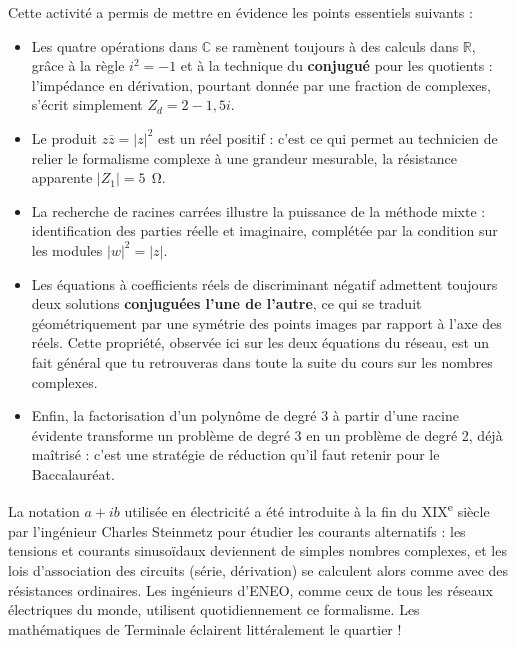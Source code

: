 \documentclass[11pt]{article}
\newcounter{popsec}
\newcounter{popsub}
\newcommand{\courssub}[1]{%
  \stepcounter{popsub}%
  \par\vspace{9pt}\noindent{\popxbold\fontsize{11.5}{13}\selectfont\color{popink}{\color{poporange}\thepopsec.\thepopsub}\hspace{6pt}#1}\par\nopagebreak\vspace{4pt}
}
\begin{document}
\courssub{Bilan de l'activité}

Cette activité a permis de mettre en évidence les points essentiels suivants :

\begin{itemize}
\item Les quatre opérations dans $\mathbb{C}$ se ramènent toujours à des calculs dans $\mathbb{R}$, grâce à la règle $i^2 = -1$ et à la technique du \textbf{conjugué} pour les quotients : l'impédance en dérivation, pourtant donnée par une fraction de complexes, s'écrit simplement $Z_d = 2 - {1,5}i$.
\item Le produit $z\overline{z} = |z|^2$ est un réel positif : c'est ce qui permet au technicien de relier le formalisme complexe à une grandeur mesurable, la résistance apparente $|Z_1| = 5\ \SI{}{\ohm}$.
\item La recherche de racines carrées illustre la puissance de la méthode mixte : identification des parties réelle et imaginaire, complétée par la condition sur les modules $|w|^2 = |z|$.
\item Les équations à coefficients réels de discriminant négatif admettent toujours deux solutions \textbf{conjuguées l'une de l'autre}, ce qui se traduit géométriquement par une symétrie des points images par rapport à l'axe des réels. Cette propriété, observée ici sur les deux équations du réseau, est un fait général que tu retrouveras dans toute la suite du cours sur les nombres complexes.
\item Enfin, la factorisation d'un polynôme de degré 3 à partir d'une racine évidente transforme un problème de degré 3 en un problème de degré 2, déjà maîtrisé : c'est une stratégie de réduction qu'il faut retenir pour le Baccalauréat.
\end{itemize}

\begin{savaistu}
La notation $a + ib$ utilisée en électricité a été introduite à la fin du XIX\textsuperscript{e} siècle par l'ingénieur Charles Steinmetz pour étudier les courants alternatifs : les tensions et courants sinusoïdaux deviennent de simples nombres complexes, et les lois d'association des circuits (série, dérivation) se calculent alors comme avec des résistances ordinaires. Les ingénieurs d'ENEO, comme ceux de tous les réseaux électriques du monde, utilisent quotidiennement ce formalisme. Les mathématiques de Terminale éclairent littéralement le quartier !
\end{savaistu}
\end{document}
